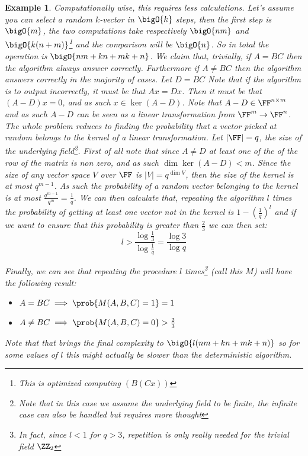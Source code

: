 \documentclass{article}
\newtheorem{example}{Example}
\begin{document}
\begin{example}
Computationally wise, this requires less calculations. Let's assume you can select a random $k$-vector in $\bigO{k}$ steps, then the first step is $\bigO{m}$, the two computations take respectively $\bigO{nm}$ and $\bigO{k (n + m)}$\footnote{This is optimized computing $(B(Cx))$} and the comparison will be $\bigO{n}$. So in total the operation is $\bigO{nm + kn + mk + n}$. We claim that, trivially, if $A = BC$ then the algorithm always answer correctly. Furthermore if $A \neq BC$ then the algorithm answers correctly in the majority of cases. Let $D = BC$ Note that if the algorithm is to output incorrectly, it must be that $Ax = Dx$. Then it must be that $(A - D) x = 0$, and as such $x \in \ker(A - D)$. Note that $A - D \in \FF^{n \times m}$ and as such $A - D$ can be seen as a linear transformation from $\FF^m \to \FF^n$. The whole problem reduces to finding the probability that a vector picked at random belongs to the kernel of a linear transformation. Let $|\FF| = q$, the size of the underlying field\footnote{Note that in this case we assume the underlying field to be finite, the infinite case can also be handled but requires more thought}. First of all note that since $A \neq D$ at least one of the of the row of the matrix is non zero, and as such $\dim \ker (A - D) < m$. Since the size of any vector space $V$ over $\FF$ is $|V| = q^{\dim V}$, then the size of the kernel is at most $q^{m - 1}$. As such the probability of a random vector belonging to the kernel is at most $\frac{q^{m-1}}{q^m}=\frac{1}{q}$. We can then calculate that, repeating the algorithm $l$ times the probability of getting at least one vector not in the kernel is $1 - \left(\frac{1}{q}\right)^l$ and if we want to ensure that this probability is greater than $\frac{2}{3}$ we can then set:
\[l > \frac{\log \frac{1}{3}}{\log \frac{1}{q}} = \frac{\log{3}}{\log{q}}\]

Finally, we can see that repeating the procedure $l$ times\footnote{In fact, since $l < 1$ for $q > 3$, repetition is only really needed for the trivial field $\ZZ_2$} (call this $M$) will have the following result:
\begin{itemize}
    \item $A = BC \implies \prob{M(A, B,C) = 1} = 1$
    \item $A \neq BC \implies \prob{M(A, B,C) = 0} > \frac{2}{3}$
\end{itemize}

Note that that brings the final complexity to $\bigO{l(nm + kn + mk + n)}$ so for some values of $l$ this might actually be slower than the deterministic algorithm.

\end{example}
\end{document}
